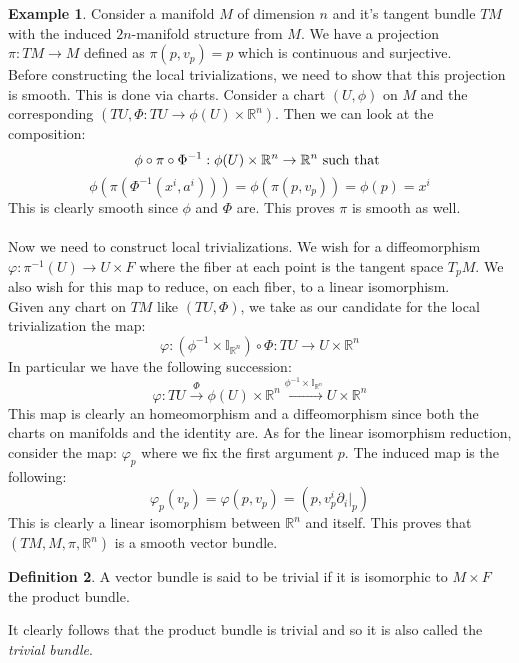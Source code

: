 \documentclass[12pt,a4paper]{report}
\theoremstyle{definition}
\newtheorem{Def}{Definition}[chapter]
\theoremstyle{Theorem}
\theoremstyle{definition}
\newtheorem{Ex}[Def]{Example}
\theoremstyle{definition}
\begin{document}
	\begin{Ex}
		Consider a manifold $M$ of dimension $n$ and it's tangent bundle $TM$ with the induced $2n$-manifold structure from $M$. We have a projection $\pi:TM\rightarrow M$ defined as $\pi(p,v_p)=p$ which is continuous and surjective. 
		\\
		Before constructing the local trivializations, we need to show that this projection is smooth. This is done via charts. Consider a chart $(U,\phi)$ on $M$ and the corresponding $(TU,\Phi:TU\rightarrow \phi(U)\times \mathbb{R}^n)$. Then we can look at the composition:
		$$\phi\circ \pi\circ \Phi^{-1}:\phi(U)\times \mathbb{R}^n\rightarrow \mathbb{R}^n \hbox{ such that }$$ 
		$$\phi(\pi(\Phi^{-1}(x^i,a^i)))=\phi(\pi(p,v_p))=\phi(p)=x^i$$
		This is clearly smooth since $\phi$ and $\Phi$ are. This proves $\pi$ is smooth as well.\\
		\\
		Now we need to construct local trivializations. We wish for a diffeomorphism $\varphi:\pi^{-1}(U)\rightarrow U\times F$ where the fiber at each point is the tangent space $T_pM$. We also wish for this map to reduce, on each fiber, to a linear isomorphism.\\
		Given any chart on $TM$ like $(TU,\Phi)$, we take as our candidate for the local trivialization the map: 
		$$\varphi:(\phi^{-1}\times \mathbb{I}_{\mathbb{R}^n})\circ \Phi:TU\rightarrow U\times \mathbb{R}^n$$
		In particular we have the following succession:
		$$\varphi:TU\xrightarrow{\text{$\Phi$}} \phi(U)\times \mathbb{R}^n\xrightarrow{\text{$\phi^{-1}\times \mathbb{I}_{\mathbb{R}^n}$}}U\times \mathbb{R}^n$$
		This map is clearly an homeomorphism and a diffeomorphism since both the charts on manifolds and the identity are. As for the linear isomorphism reduction, consider the map:
		$\varphi_p$ where we fix the first argument $p$. The induced map is the following:
		$$\varphi_p(v_p)=\varphi(p,v_p)=(p,v^i_p\partial_i|_p)$$
		This is clearly a linear isomorphism between $\mathbb{R}^n$ and itself. This proves that $(TM,M,\pi,\mathbb{R}^n)$ is a smooth vector bundle.
	\end{Ex}
	\begin{Def}\label{Def_5.3}
		A vector bundle is said to be trivial if it is isomorphic to $M\times F$ the product bundle.
	\end{Def}
	It clearly follows that the product bundle is trivial and so it is also called the \textit{trivial bundle}.
\end{document}
